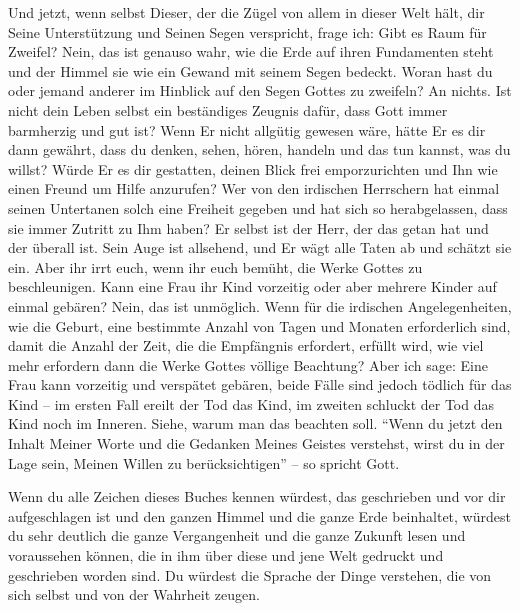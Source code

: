 Und jetzt, wenn selbst Dieser, der die Zügel von allem in dieser Welt hält, dir Seine Unterstützung und Seinen Segen verspricht, frage ich: Gibt es Raum für Zweifel? Nein, das ist genauso wahr, wie die Erde auf ihren Fundamenten steht und der Himmel sie wie ein Gewand mit seinem Segen bedeckt. Woran hast du oder jemand anderer im Hinblick auf den Segen Gottes zu zweifeln? An nichts. Ist nicht dein Leben selbst ein beständiges Zeugnis dafür, dass Gott immer barmherzig und gut ist? Wenn Er nicht allgütig gewesen wäre, hätte Er es dir dann gewährt, dass du denken, sehen, hören, handeln und das tun kannst, was du willst? Würde Er es dir gestatten, deinen Blick frei emporzurichten und Ihn wie einen Freund um Hilfe anzurufen? Wer von den irdischen Herrschern hat einmal seinen Untertanen solch eine Freiheit gegeben und hat sich so herabgelassen, dass sie immer Zutritt zu Ihm haben? Er selbst ist der Herr, der das getan hat und der überall ist. Sein Auge ist allsehend, und Er wägt alle Taten ab und schätzt sie ein. Aber ihr irrt euch, wenn ihr euch bemüht, die Werke Gottes zu beschleunigen. Kann eine Frau ihr Kind vorzeitig oder aber mehrere Kinder auf einmal gebären? Nein, das ist unmöglich. Wenn für die irdischen Angelegenheiten, wie die Geburt, eine bestimmte Anzahl von Tagen und Monaten erforderlich sind, damit die Anzahl der Zeit, die die Empfängnis erfordert, erfüllt wird, wie viel mehr erfordern dann die Werke Gottes völlige Beachtung? Aber ich sage: Eine Frau kann vorzeitig und verspätet gebären, beide Fälle sind jedoch tödlich für das Kind -- im ersten Fall ereilt der Tod das Kind, im zweiten schluckt der Tod das Kind noch im Inneren. Siehe, warum man das beachten soll. "`Wenn du jetzt den Inhalt Meiner Worte und die Gedanken Meines Geistes verstehst, wirst du in der Lage sein, Meinen Willen zu berücksichtigen"' -- so spricht Gott. 

Wenn du alle Zeichen dieses Buches kennen würdest, das geschrieben und vor dir aufgeschlagen ist und den ganzen Himmel und die ganze Erde beinhaltet, würdest du sehr deutlich die ganze Vergangenheit und die ganze Zukunft lesen und voraussehen können, die in ihm über diese und jene Welt gedruckt und geschrieben worden sind. Du würdest die Sprache der Dinge verstehen, die von sich selbst und von der Wahrheit zeugen.

